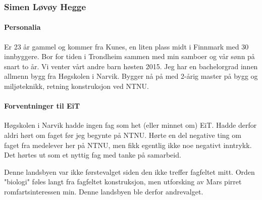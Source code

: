 ﻿\subsubsection{Simen Løvøy Hegge}

\paragraph{Personalia}
Er 23 år gammel og kommer fra Kunes, en liten plass midt i Finnmark med 30 innbyggere.
Bor for tiden i Trondheim sammen med min samboer og vår sønn på snart to år.
Vi venter vårt andre barn høsten 2015.
Jeg har en bachelorgrad innen allmenn bygg fra Høgskolen i Narvik.
Bygger nå på med 2-årig master på bygg og miljøteknikk, retning konstruksjon ved NTNU.

\paragraph{Forventninger til EiT}
Høgskolen i Narvik hadde ingen fag som het (eller minnet om) EiT.
Hadde derfor aldri hørt om faget før jeg begynte på NTNU.
Hørte en del negative ting om faget fra medelever her på NTNU, men fikk egentlig ikke noe negativt inntrykk.
Det hørtes ut som et nyttig fag med tanke på samarbeid.

Denne landsbyen var ikke førstevalget siden den ikke treffer fagfeltet mitt.
Orden "biologi" føles langt fra fagfeltet konstruksjon, men utforsking av Mars pirret romfartsinteressen min.
Denne landsbyen ble derfor andrevalget.